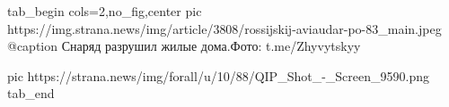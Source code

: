  
 
 
 
 


\ifcmt
  tab_begin cols=2,no_fig,center
     pic https://img.strana.news/img/article/3808/rossijskij-aviaudar-po-83_main.jpeg
		 @caption Снаряд разрушил жилые дома.Фото: t.me/Zhyvytskyy 

		 pic https://strana.news/img/forall/u/10/88/QIP_Shot_-_Screen_9590.png
  tab_end
\fi
